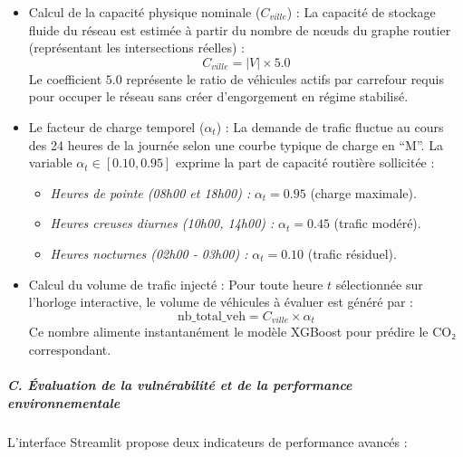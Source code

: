 \documentclass[10pt, a4paper]{article}
\providecommand{\tightlist}{}
\begin{document}
\begin{itemize}
\item
  Calcul de la capacité physique nominale (\(C_{ville}\)) : La capacité
  de stockage fluide du réseau est estimée à partir du nombre de nœuds
  du graphe routier (représentant les intersections réelles) :
  \[C_{ville} = |V| \times 5.0\] Le coefficient \(5.0\) représente le
  ratio de véhicules actifs par carrefour requis pour occuper le réseau
  sans créer d'engorgement en régime stabilisé.
\item
  Le facteur de charge temporel (\(\alpha_t\)) : La demande de trafic
  fluctue au cours des 24 heures de la journée selon une courbe typique
  de charge en ``M''. La variable \(\alpha_t \in [0.10, 0.95]\) exprime
  la part de capacité routière sollicitée :

  \begin{itemize}
  \tightlist
  \item
    \emph{Heures de pointe (08h00 et 18h00) :} \(\alpha_t = 0.95\)
    (charge maximale).
  \item
    \emph{Heures creuses diurnes (10h00, 14h00) :} \(\alpha_t = 0.45\)
    (trafic modéré).
  \item
    \emph{Heures nocturnes (02h00 - 03h00) :} \(\alpha_t = 0.10\)
    (trafic résiduel).
  \end{itemize}
\item
  Calcul du volume de trafic injecté : Pour toute heure \(t\)
  sélectionnée sur l'horloge interactive, le volume de véhicules à
  évaluer est généré par :
  \[\text{nb\_total\_veh} = C_{ville} \times \alpha_t\] Ce nombre
  alimente instantanément le modèle XGBoost pour prédire le CO₂
  correspondant.
\end{itemize}

\subparagraph{C. Évaluation de la vulnérabilité et de la performance
environnementale}\label{c.-uxe9valuation-de-la-vulnuxe9rabilituxe9-et-de-la-performance-environnementale}

L'interface Streamlit propose deux indicateurs de performance avancés :
\end{document}

